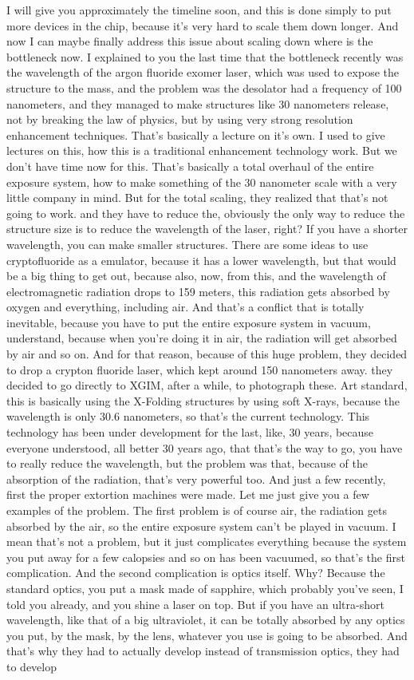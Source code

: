 I will give you approximately the timeline soon, and this is done simply to put more devices in the chip, because it's very hard to scale them down longer. And now I can maybe finally address this issue about scaling down where is the bottleneck now. I explained to you the last time that the bottleneck recently was the wavelength of the argon fluoride exomer laser, which was used to expose the structure to the mass, and the problem was the desolator had a frequency of 100 nanometers, and they managed to make structures like 30 nanometers release, not by breaking the law of physics, but by using very strong resolution enhancement techniques. That's basically a lecture on it's own. I used to give lectures on this, how this is a traditional enhancement technology work. But we don't have time now for this. That's basically a total overhaul of the entire exposure system, how to make something of the 30 nanometer scale with a very little company in mind. But for the total scaling, they realized that that's not going to work. and they have to reduce the, obviously the only way to reduce the structure size is to reduce the wavelength of the laser, right? If you have a shorter wavelength, you can make smaller structures. There are some ideas to use cryptofluoride as a emulator, because it has a lower wavelength, but that would be a big thing to get out, because also, now, from this, and the wavelength of electromagnetic radiation drops to 159 meters, this radiation gets absorbed by oxygen and everything, including air. And that's a conflict that is totally inevitable, because you have to put the entire exposure system in vacuum, understand, because when you're doing it in air, the radiation will get absorbed by air and so on. And for that reason, because of this huge problem, they decided to drop a crypton fluoride laser, which kept around 150 nanometers away. they decided to go directly to XGIM, after a while, to photograph these. Art standard, this is basically using the X-Folding structures by using soft X-rays, because the wavelength is only 30.6 nanometers, so that's the current technology. This technology has been under development for the last, like, 30 years, because everyone understood, all better 30 years ago, that that's the way to go, you have to really reduce the wavelength, but the problem was that, because of the absorption of the radiation, that's very powerful too. And just a few recently, first the proper extortion machines were made. Let me just give you a few examples of the problem. The first problem is of course air, the radiation gets absorbed by the air, so the entire exposure system can't be played in vacuum. I mean that's not a problem, but it just complicates everything because the system you put away for a few calopsies and so on has been vacuumed, so that's the first complication. And the second complication is optics itself. Why? Because the standard optics, you put a mask made of sapphire, which probably you've seen, I told you already, and you shine a laser on top. But if you have an ultra-short wavelength, like that of a big ultraviolet, it can be totally absorbed by any optics you put, by the mask, by the lens, whatever you use is going to be absorbed. And that's why they had to actually develop instead of transmission optics, they had to develop 
